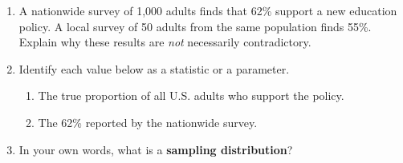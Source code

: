 \documentclass[10pt]{article}
\begin{document}
\namedateperiod

\vspace{0.15in}

\begin{enumerate}
  \item A nationwide survey of 1,000 adults finds that 62\% support a new education
        policy. A local survey of 50 adults from the same population finds 55\%.
        Explain why these results are \emph{not} necessarily contradictory.


  \item Identify each value below as a statistic or a parameter.
        \begin{enumerate}[label=\alph*.]
          \item The true proportion of all U.S. adults who support the policy.
                \hfill \blank{3.2cm}
          \item The 62\% reported by the nationwide survey.
                \hfill \blank{3.2cm}
        \end{enumerate}

  \item In your own words, what is a \textbf{sampling distribution}?

\end{enumerate}
\end{document}
